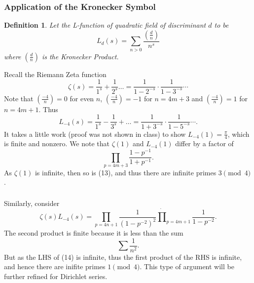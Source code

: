 \documentclass[12pt]{article}
\newtheorem{definition}{Definition}
\newcommand{\kronecker}[2]{\genfrac{(}{)}{}{}{#1}{#2}}
\begin{document}
\subsubsection{Application of the Kronecker Symbol}
\begin{definition}
    Let the L-function of quadratic field of discriminant $d$ to be
    \begin{equation}
        L_{d}(s) = \sum_{n > 0}\frac{\kronecker{d}{n}}{n^{s}}
    \end{equation}
    where $\kronecker{d}{n}$ is the Kronecker Product.
\end{definition}
Recall the Riemann Zeta function
\begin{equation}
    \zeta(s) = \frac{1}{1^{s}} + \frac{1}{2^{s}} \dots
    = \frac{1}{1-2^{-s}} \cdot \frac{1}{1-3^{-s}} \cdots
\end{equation}
Note that $\kronecker{-4}{n} = 0$ for even $n$, $\kronecker{-4}{n} = -1$ for $n = 4m + 3$ and $\kronecker{-4}{n} = 1$ for $n = 4m + 1$. Thus
\begin{equation}
    L_{-4}(s) = \frac{1}{1^{s}} - \frac{1}{3^{s}} + \dots
            = \frac{1}{1+3^{-s}} \cdot \frac{1}{1-5^{-s}} \cdots.
\end{equation}
It takes a little work (proof was not shown in class) to show $L_{-4}(1) = \frac{\pi}{4}$, which is finite and nonzero. We note that $\zeta(1)$ and $L_{-4}(1)$ differ by a factor of
\begin{equation}
    \prod_{p = 4m + 3}\frac{1-p^{-1}}{1+p^{-1}}.
\end{equation}
As $\zeta(1)$ is infinite, then so is (13), and thus there are infinite primes $3 \pmod{4}$.

\subsubsection{}
Similarly, consider
\begin{equation}
    \zeta(s)L_{-4}(s) = \prod_{p = 4n+1}\frac{1}{(1-p^{-2})^{2}}\dot \prod_{p = 4m+1}\frac{1}{1-p^{-2}}.
\end{equation}
The second product is finite because it is less than the sum
\begin{equation}
    \sum \frac{1}{n^{2}}.
\end{equation}
But as the LHS of (14) is infinite, thus the first product of the RHS is infinite, and hence there are inifite primes $1 \pmod{4}$. This type of argument will be further refined for Dirichlet series.
\end{document}
